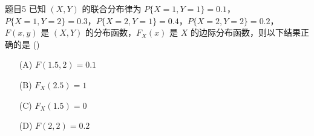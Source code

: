 \documentclass{article}
\begin{document}
\begin{question}{题目5}
    已知 $(X,Y)$ 的联合分布律为 $P\{X=1, Y=1\} = 0.1$，$P\{X=1, Y=2\} = 0.3$，$P\{X=2, Y=1\}=0.4$，$P\{X=2, Y=2\}=0.2$，$F(x,y)$ 是 $(X,Y)$ 的分布函数，$F_X(x)$ 是 $X$ 的边际分布函数，则以下结果正确的是 (\quad \quad)
    \begin{multicols}{4}
        \begin{itemize}
            \item [(A)] $F(1.5, 2) = 0.1$
            \item [(B)] $F_X(2.5) = 1$
            \item [(C)] $F_X(1.5) = 0$
            \item [(D)] $F(2,2) = 0.2$
        \end{itemize}
    \end{multicols}
\end{question}
\end{document}
